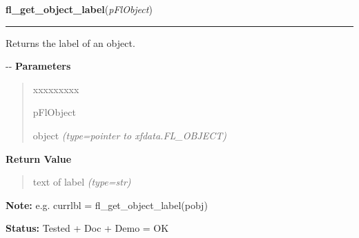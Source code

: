\hspace{.8\funcindent}\begin{boxedminipage}{\funcwidth}

    \raggedright \textbf{fl\_get\_object\_label}(\textit{pFlObject})

    \vspace{-1.5ex}

    \rule{\textwidth}{0.5\fboxrule}
\setlength{\parskip}{2ex}

Returns the label of an object.

-{}-
\setlength{\parskip}{1ex}
      \textbf{Parameters}
      \vspace{-1ex}

      \begin{quote}
        \begin{Ventry}{xxxxxxxxx}

          \item[pFlObject]


object
            {\it (type=pointer to xfdata.FL\_OBJECT)}

        \end{Ventry}

      \end{quote}

      \textbf{Return Value}
    \vspace{-1ex}

      \begin{quote}

text of label
      {\it (type=str)}

      \end{quote}

\textbf{Note:} 
e.g. currlbl = fl\_get\_object\_label(pobj)


\textbf{Status:} 
Tested + Doc + Demo = OK


    \end{boxedminipage}

    \label{xformslib:flbasic:fl_set_object_helper}

    \vspace{0.5ex}

